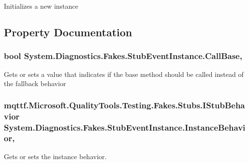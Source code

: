 Initializes a new instance



\subsection{Property Documentation}
\hypertarget{class_system_1_1_diagnostics_1_1_fakes_1_1_stub_event_instance_aef0eb96766eec3f159ea5dfae9a6e379}{
\subsubsection[{Call\-Base}]{\setlength{\rightskip}{0pt plus 5cm}bool System.\-Diagnostics.\-Fakes.\-Stub\-Event\-Instance.\-Call\-Base\hspace{0.3cm}{\ttfamily [get]}, {\ttfamily [set]}}}\label{class_system_1_1_diagnostics_1_1_fakes_1_1_stub_event_instance_aef0eb96766eec3f159ea5dfae9a6e379}


Gets or sets a value that indicates if the base method should be called instead of the fallback behavior

\hypertarget{class_system_1_1_diagnostics_1_1_fakes_1_1_stub_event_instance_aa8117d6986794b801164d42a494409bd}{
\subsubsection[{Instance\-Behavior}]{\setlength{\rightskip}{0pt plus 5cm}mqttf.\-Microsoft.\-Quality\-Tools.\-Testing.\-Fakes.\-Stubs.\-I\-Stub\-Behavior System.\-Diagnostics.\-Fakes.\-Stub\-Event\-Instance.\-Instance\-Behavior\hspace{0.3cm}{\ttfamily [get]}, {\ttfamily [set]}}}\label{class_system_1_1_diagnostics_1_1_fakes_1_1_stub_event_instance_aa8117d6986794b801164d42a494409bd}


Gets or sets the instance behavior.

